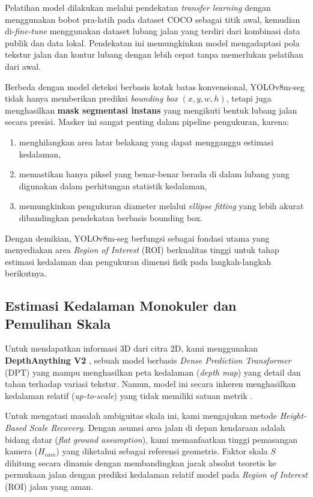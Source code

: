 \documentclass{iopjournal}
\begin{document}
Pelatihan model dilakukan melalui pendekatan \textit{transfer learning} dengan menggunakan bobot pra-latih pada dataset COCO sebagai titik awal, kemudian di-\textit{fine-tune} menggunakan dataset lubang jalan yang terdiri dari kombinasi data publik dan data lokal. Pendekatan ini memungkinkan model mengadaptasi pola tekstur jalan dan kontur lubang dengan lebih cepat tanpa memerlukan pelatihan dari awal.

Berbeda dengan model deteksi berbasis kotak batas konvensional, YOLOv8m-seg tidak hanya memberikan prediksi \textit{bounding box} $(x, y, w, h)$, tetapi juga menghasilkan \textbf{mask segmentasi instans} yang mengikuti bentuk lubang jalan secara presisi. Masker ini sangat penting dalam pipeline pengukuran, karena:

\begin{enumerate}
    \item menghilangkan area latar belakang yang dapat mengganggu estimasi kedalaman,
    \item memastikan hanya piksel yang benar-benar berada di dalam lubang yang digunakan dalam perhitungan statistik kedalaman,
    \item memungkinkan pengukuran diameter melalui \textit{ellipse fitting} yang lebih akurat dibandingkan pendekatan berbasis bounding box.
\end{enumerate}

Dengan demikian, YOLOv8m-seg berfungsi sebagai fondasi utama yang menyediakan area \textit{Region of Interest} (ROI) berkualitas tinggi untuk tahap estimasi kedalaman dan pengukuran dimensi fisik pada langkah-langkah berikutnya.

\subsection{Estimasi Kedalaman Monokuler dan Pemulihan Skala}
Untuk mendapatkan informasi 3D dari citra 2D, kami menggunakan \textbf{DepthAnything V2} \cite{depthanything2024}, sebuah model berbasis \textit{Dense Prediction Transformer} (DPT) yang mampu menghasilkan peta kedalaman (\textit{depth map}) yang detail dan tahan terhadap variasi tekstur. Namun, model ini secara inheren menghasilkan kedalaman relatif (\textit{up-to-scale}) yang tidak memiliki satuan metrik \cite{florea2025}.

Untuk mengatasi masalah ambiguitas skala ini, kami mengajukan metode \textit{Height-Based Scale Recovery}. Dengan asumsi area jalan di depan kendaraan adalah bidang datar (\textit{flat ground assumption}), kami memanfaatkan tinggi pemasangan kamera ($H_{cam}$) yang diketahui sebagai referensi geometris. Faktor skala $S$ dihitung secara dinamis dengan membandingkan jarak absolut teoretis ke permukaan jalan dengan prediksi kedalaman relatif model pada \textit{Region of Interest} (ROI) jalan yang aman.
\end{document}

